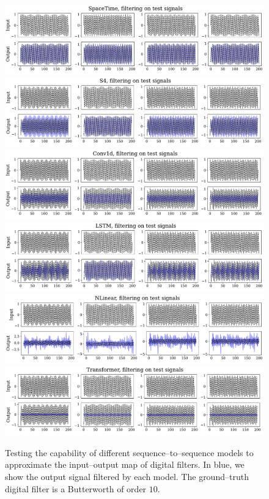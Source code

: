 \begin{figure}[h]
    \centering
    \includegraphics[scale=0.35]{_ICLR2023_paper/figures/dsp_SpaceTime.pdf}
    \includegraphics[scale=0.35]{_ICLR2023_paper/figures/dsp_S4.pdf}
    \includegraphics[scale=0.35]{_ICLR2023_paper/figures/dsp_Conv1d.pdf}
    \includegraphics[scale=0.35]{_ICLR2023_paper/figures/dsp_LSTM.pdf}
    \includegraphics[scale=0.35]{_ICLR2023_paper/figures/dsp_NLinear.pdf}
    \includegraphics[scale=0.35]{_ICLR2023_paper/figures/dsp_Transformer.pdf}
    \caption{Testing the capability of different sequence--to--sequence models to approximate the input--output map of digital filters. In blue, we show the output signal filtered by each model. The ground--truth digital filter is a Butterworth of order $10$.}
    \label{fig:dsp_synthetic}
\end{figure}
%





